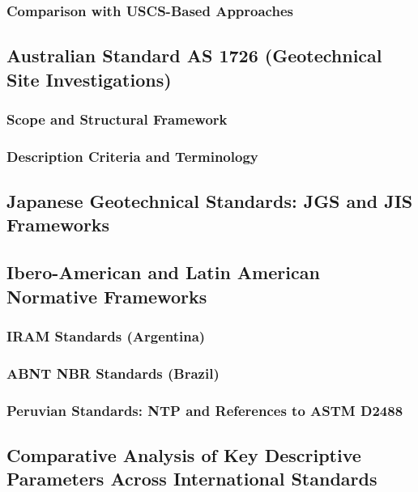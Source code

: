 \subsubsection{Comparison with USCS-Based Approaches}

\subsection{Australian Standard AS 1726 (Geotechnical Site Investigations)}

\subsubsection{Scope and Structural Framework}

\subsubsection{Description Criteria and Terminology}

\subsection{Japanese Geotechnical Standards: JGS and JIS Frameworks}

\subsection{Ibero-American and Latin American Normative Frameworks}

\subsubsection{IRAM Standards (Argentina)}

\subsubsection{ABNT NBR Standards (Brazil)}

\subsubsection{Peruvian Standards: NTP and References to ASTM D2488}

\subsection{Comparative Analysis of Key Descriptive Parameters Across International Standards}

